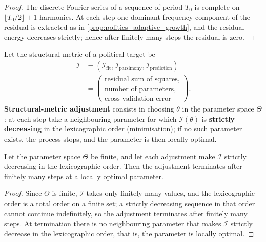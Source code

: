 \begin{proof}
The discrete Fourier series of a sequence of period $T_0$ is complete on $\lfloor T_0/2\rfloor+1$ harmonics. At each step one dominant-frequency component of the residual is extracted as in \cref{prop:politics_adaptive_growth}, and the residual energy decreases strictly; hence after finitely many steps the residual is zero.
\end{proof}

\begin{definition}\label{def:politics_structure_metric_adjustment}
Let the structural metric of a political target be
\[
\begin{aligned}
\mathcal I
&=(\mathcal I_{\text{fit}},\mathcal I_{\text{parsimony}},\mathcal I_{\text{prediction}})\\
&=\left(\begin{array}{l}
\text{residual sum of squares},\\
\text{number of parameters},\\
\text{cross-validation error}
\end{array}\right).
\end{aligned}
\]
\textbf{Structural-metric adjustment} consists in choosing $\theta$ in the parameter space $\Theta$: at each step take a neighbouring parameter for which $\mathcal I(\theta)$ is \textbf{strictly decreasing} in the lexicographic order (minimisation); if no such parameter exists, the process stops, and the parameter is then locally optimal.
\end{definition}

\begin{proposition}\label{prop:politics_structure_metric_convergence}
Let the parameter space $\Theta$ be finite, and let each adjustment make $\mathcal I$ strictly decreasing in the lexicographic order. Then the adjustment terminates after finitely many steps at a locally optimal parameter.
\end{proposition}

\begin{proof}
Since $\Theta$ is finite, $\mathcal I$ takes only finitely many values, and the lexicographic order is a total order on a finite set; a strictly decreasing sequence in that order cannot continue indefinitely, so the adjustment terminates after finitely many steps. At termination there is no neighbouring parameter that makes $\mathcal I$ strictly decrease in the lexicographic order, that is, the parameter is locally optimal.
\end{proof}

